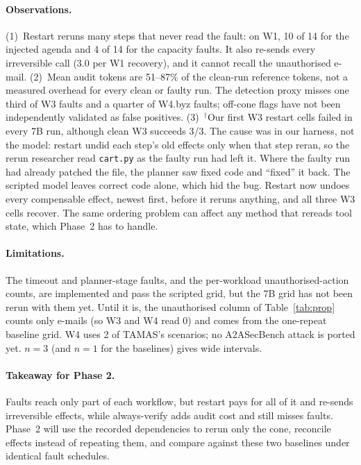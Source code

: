\documentclass[10pt,twocolumn,letterpaper]{article}
\begin{document}
\paragraph{Observations.}
(1)~Restart reruns many steps that never read the fault: on W1, 10 of 14 for
the injected agenda and 4 of 14 for the capacity faults. It also re-sends every
irreversible call (3.0 per W1 recovery), and it cannot recall the unauthorised
e-mail. (2)~Mean audit tokens are 51--87\% of the clean-run reference
tokens, not a measured overhead for every clean or faulty run. The detection
proxy misses one third of W3 faults and a quarter of W4.byz faults; off-cone
flags have not been independently validated as false positives.
(3)~$^\dagger$Our first W3 restart cells failed in every 7B run, although
clean W3 succeeds 3/3. The cause was in our harness, not the model: restart
undid each step's old effects only when that step reran, so the rerun
researcher read \texttt{cart.py} as the faulty run had left it. Where the
faulty run had already patched the file, the planner saw fixed code and
``fixed'' it back. The scripted model leaves correct code alone, which hid the
bug. Restart now undoes every compensable effect, newest first, before it
reruns anything, and all three W3 cells recover. The same ordering problem can
affect any method that rereads tool state, which Phase~2 has to handle.

\paragraph{Limitations.} The timeout and planner-stage faults, and the
per-workload unauthorised-action counts, are implemented and pass the scripted
grid, but the 7B grid has not been rerun with them yet. Until it is, the
unauthorised column of Table~\ref{tab:prop} counts only e-mails (so W3 and W4
read 0) and comes from the one-repeat baseline grid. W4 uses 2 of TAMAS's
scenarios; no A2ASecBench attack is ported yet. $n{=}3$ (and $n{=}1$ for
the baselines) gives wide intervals.

\paragraph{Takeaway for Phase 2.} Faults reach only part of each workflow, but
restart pays for all of it and re-sends irreversible effects, while
always-verify adds audit cost and still misses faults. Phase~2 will use the
recorded dependencies to rerun only the cone, reconcile effects instead of
repeating them, and compare against these two baselines under identical fault
schedules.
\end{document}
